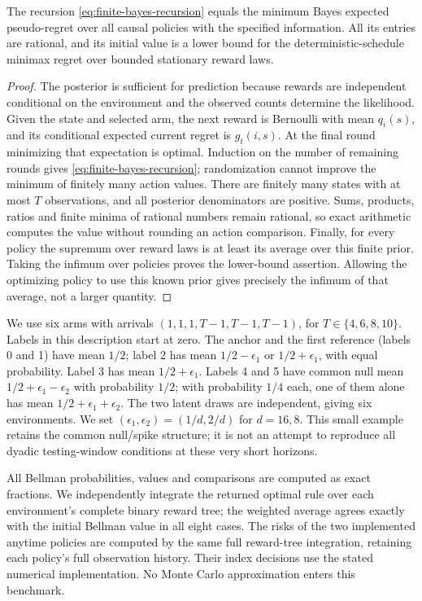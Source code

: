\begin{proposition}\label{prop:exact-finite-bayes}
The recursion \eqref{eq:finite-bayes-recursion} equals the minimum Bayes expected pseudo-regret over all causal policies with the specified information. All its entries are rational, and its initial value is a lower bound for the deterministic-schedule minimax regret over bounded stationary reward laws.
\end{proposition}
\begin{proof}
The posterior is sufficient for prediction because rewards are independent conditional on the environment and the observed counts determine the likelihood. Given the state and selected arm, the next reward is Bernoulli with mean $q_i(s)$, and its conditional expected current regret is $g_t(i,s)$. At the final round minimizing that expectation is optimal. Induction on the number of remaining rounds gives \eqref{eq:finite-bayes-recursion}; randomization cannot improve the minimum of finitely many action values. There are finitely many states with at most $T$ observations, and all posterior denominators are positive. Sums, products, ratios and finite minima of rational numbers remain rational, so exact arithmetic computes the value without rounding an action comparison. Finally, for every policy the supremum over reward laws is at least its average over this finite prior. Taking the infimum over policies proves the lower-bound assertion. Allowing the optimizing policy to use this known prior gives precisely the infimum of that average, not a larger quantity.
\end{proof}

We use six arms with arrivals $(1,1,1,T-1,T-1,T-1)$, for $T\in\{4,6,8,10\}$. Labels in this description start at zero. The anchor and the first reference (labels 0 and 1) have mean $1/2$; label 2 has mean $1/2-\epsilon_1$ or $1/2+\epsilon_1$, with equal probability. Label 3 has mean $1/2+\epsilon_1$. Labels 4 and 5 have common null mean $1/2+\epsilon_1-\epsilon_2$ with probability $1/2$; with probability $1/4$ each, one of them alone has mean $1/2+\epsilon_1+\epsilon_2$. The two latent draws are independent, giving six environments. We set $(\epsilon_1,\epsilon_2)=(1/d,2/d)$ for $d=16,8$. This small example retains the common null/spike structure; it is not an attempt to reproduce all dyadic testing-window conditions at these very short horizons.

All Bellman probabilities, values and comparisons are computed as exact fractions. We independently integrate the returned optimal rule over each environment's complete binary reward tree; the weighted average agrees exactly with the initial Bellman value in all eight cases. The risks of the two implemented anytime policies are computed by the same full reward-tree integration, retaining each policy's full observation history. Their index decisions use the stated numerical implementation. No Monte Carlo approximation enters this benchmark.

